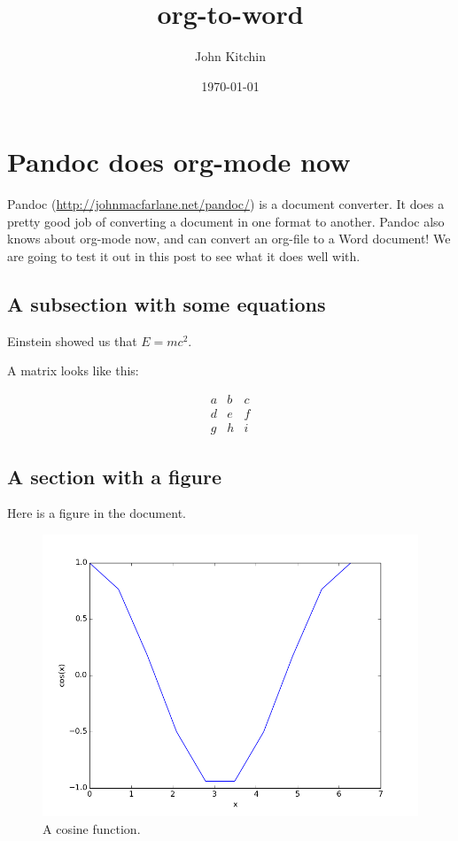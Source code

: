 \documentclass[11pt]{article}
\author{John Kitchin}
\date{\today}
\title{org-to-word}
\begin{document}
\tableofcontents

\section{Pandoc does org-mode now}
\label{sec-1}

Pandoc (\url{http://johnmacfarlane.net/pandoc/}) is a document converter. It does a pretty good job of converting a document in one format to another. Pandoc also knows about org-mode now, and can convert an org-file to a Word document! We are going to test it out in this post to see what it does well with.

\subsection{A subsection with some equations}
\label{sec-1-1}

Einstein showed us that $E = mc^2$. 

A matrix looks like this:

\begin{equation}
\begin{matrix}
  a & b & c \\
  d & e & f \\
  g & h & i
 \end{matrix}
\end{equation}

\subsection{A section with a figure}
\label{sec-1-2}

Here is a figure in the document.

\begin{figure}[htb]
\centering
\includegraphics[width=.9\linewidth]{./images/cos-plot.png}
\caption{A cosine function.}
\end{figure}
\end{document}

